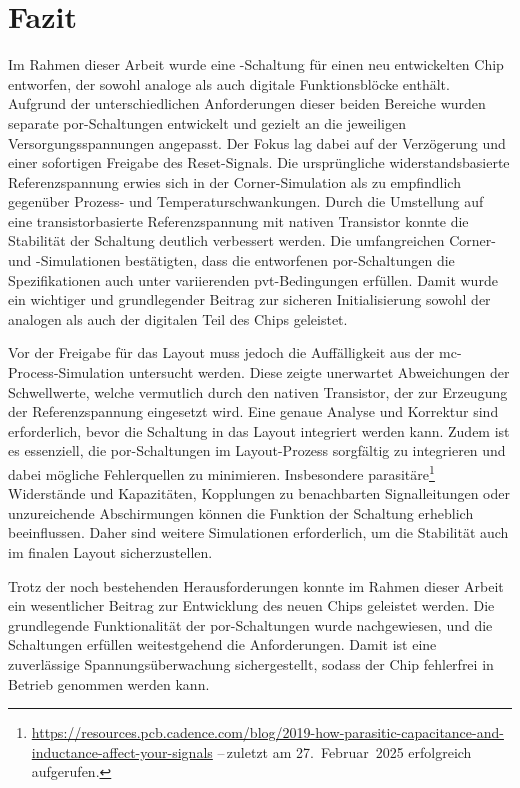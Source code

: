\chapter{Fazit}\label{chap:Schluss}
Im Rahmen dieser Arbeit wurde eine -Schaltung für einen neu entwickelten Chip entworfen, der sowohl analoge als auch digitale Funktionsblöcke enthält. Aufgrund der unterschiedlichen Anforderungen dieser beiden Bereiche wurden separate \gls{por}-Schaltungen entwickelt und gezielt an die jeweiligen Versorgungsspannungen angepasst. Der Fokus lag dabei auf der Verzögerung und einer sofortigen Freigabe des Reset-Signals. Die ursprüngliche widerstandsbasierte Referenzspannung erwies sich in der Corner-Simulation als zu empfindlich gegenüber Prozess- und Temperaturschwankungen. Durch die Umstellung auf eine transistorbasierte Referenzspannung mit nativen Transistor konnte die Stabilität der Schaltung deutlich verbessert werden. Die umfangreichen Corner- und -Simulationen bestätigten, dass die entworfenen \gls{por}-Schaltungen die Spezifikationen auch unter variierenden \gls{pvt}-Bedingungen erfüllen. Damit wurde ein wichtiger und grundlegender Beitrag zur sicheren Initialisierung sowohl der analogen als auch der digitalen Teil des Chips geleistet.

Vor der Freigabe für das Layout muss jedoch die Auffälligkeit aus der \gls{mc}-Process-Simulation untersucht werden. Diese zeigte unerwartet Abweichungen der Schwellwerte, welche vermutlich durch den nativen Transistor, der zur Erzeugung der Referenzspannung eingesetzt wird. Eine genaue Analyse und Korrektur sind erforderlich, bevor die Schaltung in das Layout integriert werden kann. Zudem ist es essenziell, die \gls{por}-Schaltungen im Layout-Prozess sorgfältig zu integrieren und dabei mögliche Fehlerquellen zu minimieren. Insbesondere parasitäre\footnote{\url{https://resources.pcb.cadence.com/blog/2019-how-parasitic-capacitance-and-inductance-affect-your-signals} --\,zuletzt am 27.~Februar~2025 erfolgreich aufgerufen.} Widerstände und Kapazitäten, Kopplungen zu benachbarten Signalleitungen oder unzureichende Abschirmungen können die Funktion der Schaltung erheblich beeinflussen. Daher sind weitere Simulationen erforderlich, um die Stabilität auch im finalen Layout sicherzustellen.

Trotz der noch bestehenden Herausforderungen konnte im Rahmen dieser Arbeit ein wesentlicher Beitrag zur Entwicklung des neuen Chips geleistet werden. Die grundlegende Funktionalität der \gls{por}-Schaltungen wurde nachgewiesen, und die Schaltungen erfüllen weitestgehend die Anforderungen. Damit ist eine zuverlässige Spannungsüberwachung sichergestellt, sodass der Chip fehlerfrei in Betrieb genommen werden kann. 
%
\label{contentPages:End}